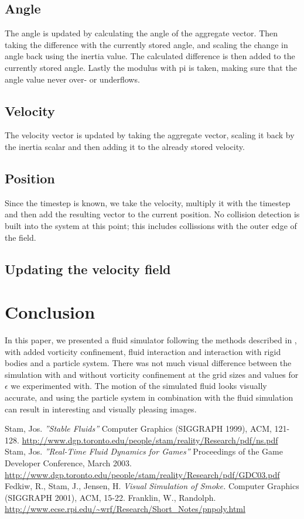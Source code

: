 \documentclass[a4paper,twoside,11pt,twocolumn]{article}
\begin{document}
\subsection{Angle}
The angle is updated by calculating the angle of the aggregate vector. Then taking the difference with the currently stored angle, and scaling the change in angle back using the inertia value. The calculated difference is then added to the currently stored angle. Lastly the modulus with pi is taken, making sure that the angle value never over- or underflows.

\subsection{Velocity}
The velocity vector is updated by taking the aggregate vector, scaling it back by the inertia scalar and then adding it to the already stored velocity.

\subsection{Position}
Since the timestep is known, we take the velocity, multiply it with the timestep and then add the resulting vector to the current position. No collision detection is built into the system at this point; this includes collissions with the outer edge of the field.

\subsection{Updating the velocity field}


\section{Conclusion}
In this paper, we presented a fluid simulator following the methods described in \cite{url:stam1, url:stam2}, with added vorticity confinement, fluid interaction and interaction with rigid bodies and a particle system. There was not much visual difference between the simulation with and without vorticity confinement at the grid sizes and values for $\epsilon$ we experimented with.
The motion of the simulated fluid looks visually accurate, and using the particle system in combination with the fluid simulation can result in interesting and visually pleasing images.


\begin{thebibliography}{9}
		Stam, Jos. \emph{''Stable Fluids''} Computer Graphics (SIGGRAPH 1999), ACM, 121-128. \url{http://www.dgp.toronto.edu/people/stam/reality/Research/pdf/ns.pdf}
		Stam, Jos. \emph{''Real-Time Fluid Dynamics for Games''} Proceedings of the Game Developer Conference, March 2003. \url{http://www.dgp.toronto.edu/people/stam/reality/Research/pdf/GDC03.pdf}
		Fedkiw, R., Stam, J., Jensen, H. \emph{Visual Simulation of Smoke.} Computer Graphics (SIGGRAPH 2001), ACM, 15-22.
		Franklin, W., Randolph. \url{http://www.ecse.rpi.edu/\~wrf/Research/Short\_Notes/pnpoly.html}
\end{thebibliography}
\end{document}
